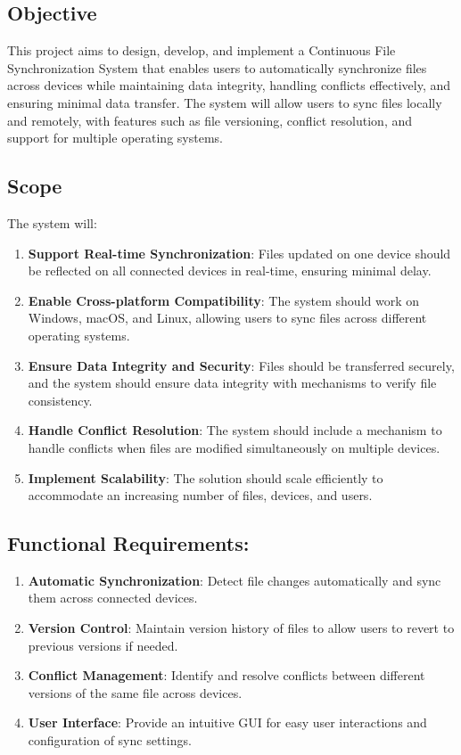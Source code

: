 \documentclass{book}
\begin{document}
      \subsection*{Objective}
      {

        This project aims to design, develop, and implement a Continuous File Synchronization System that enables users to automatically synchronize files across devices while maintaining data integrity, handling conflicts effectively, and ensuring minimal data transfer. The system will allow users to sync files locally and remotely, with features such as file versioning, conflict resolution, and support for multiple operating systems.
      }
      
      \subsection*{Scope}
      {
        The system will:
        \begin{enumerate}
          \item \textbf{Support Real-time Synchronization}: Files updated on one device should be reflected on all connected devices in real-time, ensuring minimal delay.
          \item \textbf{Enable Cross-platform Compatibility}: The system should work on Windows, macOS, and Linux, allowing users to sync files across different operating systems.
          \item \textbf{Ensure Data Integrity and Security}: Files should be transferred securely, and the system should ensure data integrity with mechanisms to verify file consistency.
          \item \textbf{Handle Conflict Resolution}: The system should include a mechanism to handle conflicts when files are modified simultaneously on multiple devices.
          \item \textbf{Implement Scalability}: The solution should scale efficiently to accommodate an increasing number of files, devices, and users.
        \end{enumerate}
      }
      
      \subsection*{Functional Requirements:}
      {
        \begin{enumerate}
          \item \textbf{Automatic Synchronization}: Detect file changes automatically and sync them across connected devices.
          \item \textbf{Version Control}: Maintain version history of files to allow users to revert to previous versions if needed.
          \item \textbf{Conflict Management}: Identify and resolve conflicts between different versions of the same file across devices.
          \item \textbf{User Interface}: Provide an intuitive GUI for easy user interactions and configuration of sync settings.
        \end{enumerate}
      } 
\end{document}
